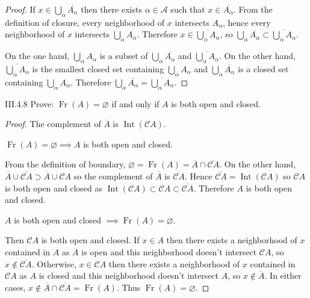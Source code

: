 \begin{proof}
	If \( x \in \bigcup_{\alpha} \overline{A_{\alpha}} \) then there exists \( \alpha \in \mathscr{A} \) such that \( x \in \overline{A_{\alpha}} \). From the definition of closure, every neighborhood of \(x\) intersects \( A_{\alpha} \), hence every neighborhood of \(x\) intersects \( \bigcup_{\alpha} A_{\alpha} \). Therefore \( x \in \overline{\bigcup_{\alpha} A_{\alpha}} \), so \( \bigcup_{\alpha} \overline{A_{\alpha}} \subset \overline{\bigcup_{\alpha} A_{\alpha}} \).

	On the one hand, \( \bigcup_{\alpha} A_{\alpha} \) is a subset of \( \bigcup_{\alpha} \overline{A_{\alpha}} \) and \( \overline{\bigcup_{\alpha} A_{\alpha}} \). On the other hand, \( \overline{\bigcup_{\alpha} A_{\alpha}} \) is the smallest closed set containing \( \bigcup_{\alpha} A_{\alpha} \) and \( \bigcup_{\alpha} \overline{A_{\alpha}} \) is a closed set containing \( \bigcup_{\alpha} A_{\alpha} \). Therefore \( \bigcup_{\alpha} \overline{A_{\alpha}} = \overline{\bigcup_{\alpha} A_{\alpha}} \).
\end{proof}

\begin{problem}{III.4.8}
Prove: \( \operatorname{Fr}(A) = \varnothing \) if and only if \(A\) is both open and closed.
\end{problem}

\begin{proof}
	The complement of \( \overline{A} \) is \( \operatorname{Int}(\mathscr{C}A) \).

	\( \operatorname{Fr}(A) = \varnothing \implies A \) is both open and closed.

	From the definition of boundary, \( \varnothing = \operatorname{Fr}(A) = \overline{A} \cap \overline{\mathscr{C}A} \). On the other hand, \( \overline{A} \cup \overline{\mathscr{C}A} \supset \overline{A} \cup \mathscr{C}A \) so the complement of \( \overline{A} \) is \( \overline{\mathscr{C}A} \). Hence \( \overline{\mathscr{C}A} = \operatorname{Int}(\mathscr{C}A) \) so \( \mathscr{C}A \) is both open and closed as \( \operatorname{Int}(\mathscr{C}A) \subset \mathscr{C}A \subset \overline{\mathscr{C}A} \). Therefore \(A\) is both open and closed.

	\( A \) is both open and closed \( \implies \operatorname{Fr}(A) = \varnothing \).

	Then \( \mathscr{C}A \) is both open and closed. If \( x \in A \) then there exists a neighborhood of \(x\) contained in \(A\) as \(A\) is open and this neighborhood doesn't intersect \(\mathscr{C}A\), so \( x \notin \overline{\mathscr{C}A} \). Otherwise, \( x \in \mathscr{C}A \) then there exists a neighborhood of \(x\) contained in \(\mathscr{C}A\) as \( A \) is closed and this neighborhood doesn't intersect \(A\), so \( x \notin \overline{A} \). In either cases, \( x \notin \overline{A} \cap \overline{\mathscr{C}A} = \operatorname{Fr}(A) \). Thus \( \operatorname{Fr}(A) = \varnothing \).
\end{proof}

